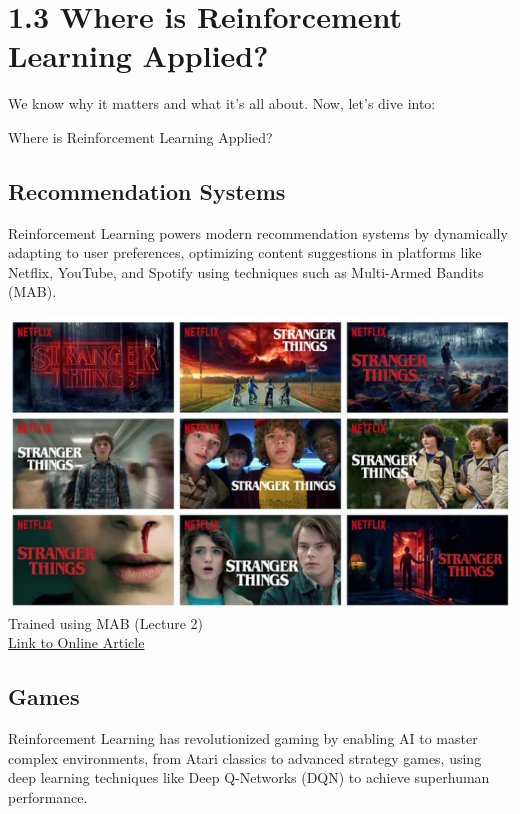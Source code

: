 \documentclass[
  letterpaper,
  DIV=11,
  numbers=noendperiod]{scrreprt}
\begin{document}
\chapter{1.3 Where is Reinforcement Learning
Applied?}\label{where-is-reinforcement-learning-applied}

\begin{tcolorbox}[enhanced jigsaw, arc=.35mm, toprule=.15mm, leftrule=.75mm, colback=white, left=2mm, colframe=quarto-callout-note-color-frame, rightrule=.15mm, opacityback=0, breakable, bottomrule=.15mm]

We know why it matters and what it's all about. Now, let's dive into:

Where is Reinforcement Learning Applied? 🤔

\end{tcolorbox}

\section{Recommendation Systems}\label{recommendation-systems}

Reinforcement Learning powers modern recommendation systems by
dynamically adapting to user preferences, optimizing content suggestions
in platforms like Netflix, YouTube, and Spotify using techniques such as
Multi-Armed Bandits (MAB).

\includegraphics[width=0.5\linewidth,height=\textheight,keepaspectratio]{lecture1/images/Neflix.png}\\
Trained using MAB (Lecture 2)\\
\href{https://netflixtechblog.com/artwork-personalization-c589f074ad76}{Link
to Online Article}

\section{Games}\label{games}

Reinforcement Learning has revolutionized gaming by enabling AI to
master complex environments, from Atari classics to advanced strategy
games, using deep learning techniques like Deep Q-Networks (DQN) to
achieve superhuman performance.
\end{document}
